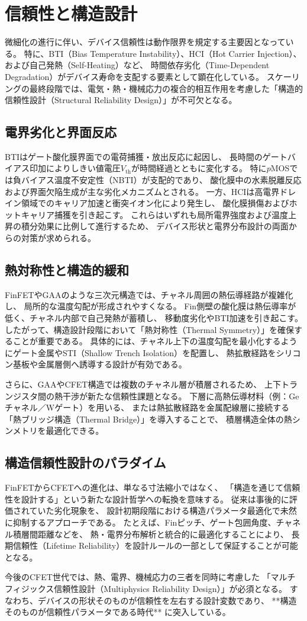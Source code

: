 \section{信頼性と構造設計}
微細化の進行に伴い、デバイス信頼性は動作限界を規定する主要因となっている。  
特に、BTI（Bias Temperature Instability）、HCI（Hot Carrier Injection）、および自己発熱（Self-Heating）など、  
時間依存劣化（Time-Dependent Degradation）がデバイス寿命を支配する要素として顕在化している。  
スケーリングの最終段階では、電気・熱・機械応力の複合的相互作用を考慮した「構造的信頼性設計（Structural Reliability Design）」が不可欠となる。

\subsection{電界劣化と界面反応}
BTIはゲート酸化膜界面での電荷捕獲・放出反応に起因し、  
長時間のゲートバイアス印加によりしきい値電圧$V_\mathrm{th}$が時間経過とともに変化する。  
特に$p$MOSでは負バイアス温度不安定性（NBTI）が支配的であり、  
酸化膜中の水素脱離反応および界面欠陥生成が主な劣化メカニズムとされる。  
一方、HCIは高電界ドレイン領域でのキャリア加速と衝突イオン化により発生し、  
酸化膜損傷およびホットキャリア捕獲を引き起こす。  
これらはいずれも局所電界強度および温度上昇の積分効果に比例して進行するため、  
デバイス形状と電界分布設計の両面からの対策が求められる。

\subsection{熱対称性と構造的緩和}
FinFETやGAAのような三次元構造では、チャネル周囲の熱伝導経路が複雑化し、  
局所的な温度勾配が形成されやすくなる。  
Fin側壁の酸化膜は熱伝導率が低く、チャネル内部で自己発熱が蓄積し、  
移動度劣化やBTI加速を引き起こす。  
したがって、構造設計段階において「熱対称性（Thermal Symmetry）」を確保することが重要である。  
具体的には、チャネル上下の温度勾配を最小化するようにゲート金属やSTI（Shallow Trench Isolation）を配置し、  
熱拡散経路をシリコン基板や金属層側へ誘導する設計が有効である。

さらに、GAAやCFET構造では複数のチャネル層が積層されるため、  
上下トランジスタ間の熱干渉が新たな信頼性課題となる。  
下層に高熱伝導材料（例：Geチャネル／Wゲート）を用いる、  
または熱拡散経路を金属配線層に接続する「熱ブリッジ構造（Thermal Bridge）」を導入することで、  
積層構造全体の熱シンメトリを最適化できる。

\subsection{構造信頼性設計のパラダイム}
FinFETからCFETへの進化は、単なる寸法縮小ではなく、  
「構造を通じて信頼性を設計する」という新たな設計哲学への転換を意味する。  
従来は事後的に評価されていた劣化現象を、  
設計初期段階における構造パラメータ最適化で未然に抑制するアプローチである。  
たとえば、Finピッチ、ゲート包囲角度、チャネル積層間距離などを、  
熱・電界分布解析と統合的に最適化することにより、  
長期信頼性（Lifetime Reliability）を設計ルールの一部として保証することが可能となる。

今後のCFET世代では、熱、電界、機械応力の三者を同時に考慮した  
「マルチフィジックス信頼性設計（Multiphysics Reliability Design）」が必須となる。  
すなわち、デバイスの形状そのものが信頼性を左右する設計変数であり、  
**構造そのものが信頼性パラメータである時代** に突入している。


